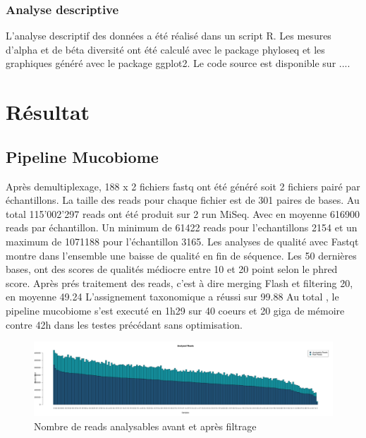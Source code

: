 \documentclass[12pt,a4paper]{article}
\begin{document}
\subsubsection{Analyse descriptive}
L'analyse descriptif des données a été réalisé dans un script R. Les mesures d'alpha et de béta diversité ont été calculé avec le package phyloseq et les graphiques généré avec le package ggplot2. 
Le code source est disponible sur .... 

\section{Résultat}
\subsection{Pipeline Mucobiome}
Après demultiplexage, 188 x 2 fichiers fastq ont été généré soit 2 fichiers pairé par échantillons.
La taille des reads pour chaque fichier est de 301 paires de bases.
Au total 115’002’297 reads ont été produit sur 2 run MiSeq. Avec en moyenne 616900 reads par échantillon. Un minimum de 61422 reads pour l’echantillons 2154 et un maximum de 1071188 pour l’échantillon 3165.
Les analyses de qualité avec Fastqt montre dans l’ensemble une baisse de qualité en fin de séquence. Les 50 dernières bases, ont des scores de qualités médiocre entre 10 et 20 point selon le phred score.
Après prés traitement des reads, c’est à dire merging Flash et filtering 20, en moyenne 49.24 %
L’assignement taxonomique a réussi sur 99.88%
Au total , le pipeline mucobiome s’est executé en 1h29 sur 40 coeurs et 20 giga de mémoire contre 42h dans les testes précédant sans optimisation.

\begin{figure}[ht]
\begin{center}
\includegraphics[scale=0.25]{img/pipeline.png}\hfill
\end{center}
\caption{Nombre de reads analysables avant et après filtrage}
\label{all}
\end{figure}
\end{document}
